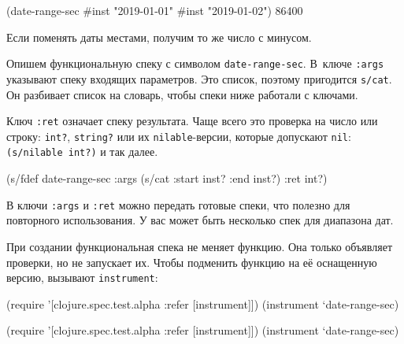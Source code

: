 \else

\begin{english}
  \begin{clojure}
(date-range-sec #inst "2019-01-01" #inst "2019-01-02")
86400
  \end{clojure}
\end{english}

\fi

\noindent
Если поменять даты местами, получим то же число с минусом.

Опишем функциональную спеку с символом \verb|date-range-sec|. В~ключе
\verb|:args| указывают спеку входящих параметров. Это список, поэтому пригодится
\verb|s/cat|. Он разбивает список на словарь, чтобы спеки ниже работали с
ключами.

Ключ \verb|:ret| означает спеку результата. Чаще всего это проверка на число или
строку: \verb|int?|, \verb|string?| или их \verb|nilable|-версии, которые
допускают \verb|nil|: \verb|(s/nilable int?)| и так далее.


\begin{english}
  \begin{clojure}
(s/fdef date-range-sec
  :args (s/cat :start inst? :end inst?)
  :ret int?)
  \end{clojure}
\end{english}

В ключи \verb|:args| и \verb|:ret| можно передать готовые спеки, что полезно
для повторного использования. У вас может быть несколько спек для диапазона дат.

При создании функциональная спека не меняет функцию. Она только объявляет
проверки, но не запускает их. Чтобы подменить функцию на её оснащенную версию,
вызывают \verb|instrument|:

\ifx\DEVICETYPE\MOBILE

\begin{english}
  \begin{clojure}
(require '[clojure.spec.test.alpha
           :refer [instrument]])
(instrument `date-range-sec)
  \end{clojure}
\end{english}

\else

\begin{english}
  \begin{clojure}
(require '[clojure.spec.test.alpha :refer [instrument]])
(instrument `date-range-sec)
  \end{clojure}
\end{english}

